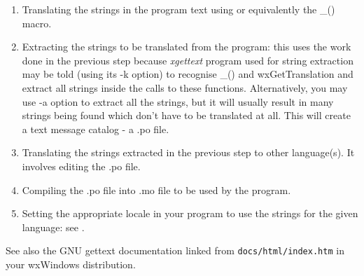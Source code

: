 \begin{enumerate}\itemsep=0pt
\item Translating the strings in the program text using 
 or equivalently the \_() macro.
\item Extracting the strings to be translated from the program: this uses the
work done in the previous step because {\it xgettext} program used for string
extraction may be told (using its -k option) to recognise \_() and
wxGetTranslation and extract all strings inside the calls to these functions.
Alternatively, you may use -a option to extract all the strings, but it will
usually result in many strings being found which don't have to be translated at
all. This will create a text message catalog - a .po file.
\item Translating the strings extracted in the previous step to other
language(s). It involves editing the .po file.
\item Compiling the .po file into .mo file to be used by the program.
\item Setting the appropriate locale in your program to use the strings for the
given language: see .
\end{enumerate}

See also the GNU gettext documentation linked from {\tt docs/html/index.htm} in
your wxWindows distribution.

